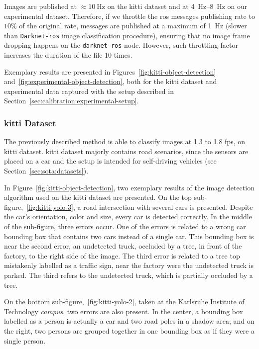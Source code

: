 Images are published at $\approx\SI{10}{\hertz}$ on the \ac{kitti} dataset and at \SIrange[range-units=single]{4}{8}{\hertz} on our experimental dataset. Therefore, if we throttle the \ac{ros} messages publishing rate to $10\%$ of the original rate, messages are published at a maximum of \SI{1}{\hertz} (slower than \texttt{Darknet-ros} image classification procedure), ensuring that no image frame dropping happens on the \texttt{darknet-ros} node. However, such throttling factor increases the duration of the file 10 times.

Exemplary results are presented in Figures~\ref{fig:kitti-object-detection} and~\ref{fig:experimental-object-detection}, both for the \ac{kitti} dataset and experimental data captured with the setup described in Section~\ref{sec:calibration:experimental-setup}.
	
\subsubsection{\ac{kitti} Dataset}
The previously described method is able to classify images at 1.3 to 1.8 \ac{fps}, on \ac{kitti} dataset. \ac{kitti} dataset majorly contains road scenarios, since the sensors are placed on a car and the setup is intended for self-driving vehicles (see Section~\ref{sec:sota:datasets}).

In Figure~\ref{fig:kitti-object-detection}, two exemplary results of the image detection algorithm used on the \ac{kitti} dataset are presented. On the top sub-figure,~\ref{fig:kitti-yolo-3}, a road intersection with several cars is presented. Despite the car's orientation, color and size, every car is detected correctly. In the middle of the sub-figure, three errors occur. One of the errors is related to a wrong car bounding box that contains two cars instead of a single car. This bounding box is near the second error, an undetected truck, occluded by a tree, in front of the factory, to the right side of the image. The third error is related to a tree top mistakenly labelled as a traffic sign, near the factory were the undetected truck is parked. The third refers to the undetected truck, which is partially occluded by a tree.

On the bottom sub-figure,~\ref{fig:kitti-yolo-2}, taken at the Karlsruhe Institute of Technology \textit{campus}, two errors are also present. In the center, a bounding box labelled as a person is actually a car and two road poles in a shadow area; and on the right, two persons are grouped together in one bounding box as if they were a single person.
	
